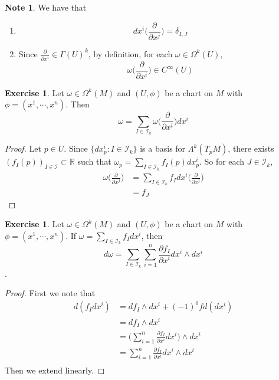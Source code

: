 \documentclass{book}
\theoremstyle{definition}
\newtheorem{note}[definition]{Note}
\newtheorem{ex}[definition]{Exercise}
\newcommand{\del}{\delta}
\newcommand{\om}{\omega}
\newcommand{\Gam}{\Gamma}
\newcommand{\Lam}{\Lambda}
\newcommand{\Om}{\Omega}
\newcommand{\R}{\mathbb{R}}
\newcommand{\MI}{\mathcal{I}}
\DeclareMathOperator*{\0}{\mbf{0}}
\DeclareMathOperator*{\1}{\mbf{1}}
\newcommand{\p}{\partial}
\begin{document}
	\begin{note} We have that
	\begin{enumerate}
	\item  $$d x^i \bigg (\frac{\p}{\p x^j} \bigg) = \del_{I,J}$$
	\item Since $\frac{\p}{\p x^i} \in \Gam(U)^k$, by definition, for each $\om \in \Om^k(U)$, $$\om \bigg(\frac{\p}{\p x^i} \bigg) \in C^{\infty}(U)$$
	\end{enumerate}
	\end{note}

	\begin{ex}
		Let $\om \in \Om^k(M)$ and $(U, \phi)$ be a chart on $M$ with $\phi = (x^1, \cdots, x^n)$. Then $$\om = \sum_{I \in \MI_k}\om \bigg(\frac{\p}{\p x^i} \bigg) dx^i$$
	\end{ex}

	\begin{proof}
		Let $p \in U$. Since $\{dx^i_p: I \in \MI_k\}$ is a basis for $\Lam^k(T_pM)$, there exists $(f_I(p))_{I \in \MI} \subset \R$ such that $\om_p = \sum\limits_{I \in \MI_k} f_I(p) dx^i_p$. So for each $J \in \MI_k$, 
		\begin{align*}
			\om\bigg (\frac{\p}{\p x^j} \bigg ) 
			&= \sum\limits_{I \in \MI_k} f_I dx^i \bigg (\frac{\p}{\p x^j} \bigg )  \\
			&= f_J
		\end{align*} 
	\end{proof}

	\begin{ex}
		Let $\om \in \Om^k(M)$ and $(U, \phi)$ be a chart on $M$ with $\phi = (x^1, \cdots, x^n)$. If $\om = \sum\limits_{I \in \MI_k}f_I dx^i$, then $$d \om  = \sum_{I \in \MI_k} \sum_{i =1}^n \frac{\p f_I}{\p x^i} dx^i \wedge dx^i$$.
	\end{ex}

	\begin{proof}
		First we note that
		\begin{align*}
			d(f_I dx^i) 
			&= df_I \wedge dx^i + (-1)^0 f d(dx^i) \\
			&= df_I \wedge dx^i \\
			&= \bigg( \sum\limits_{i=1}^n \frac{\p f_I}{\p x^i}dx^i  \bigg) \wedge dx^i \\
			&= \sum\limits_{i=1}^n {\frac{\p f_I}{\p x^i}}dx^i \wedge dx^i \\
		\end{align*}
		Then we extend linearly.
	\end{proof}
	
\end{document}
